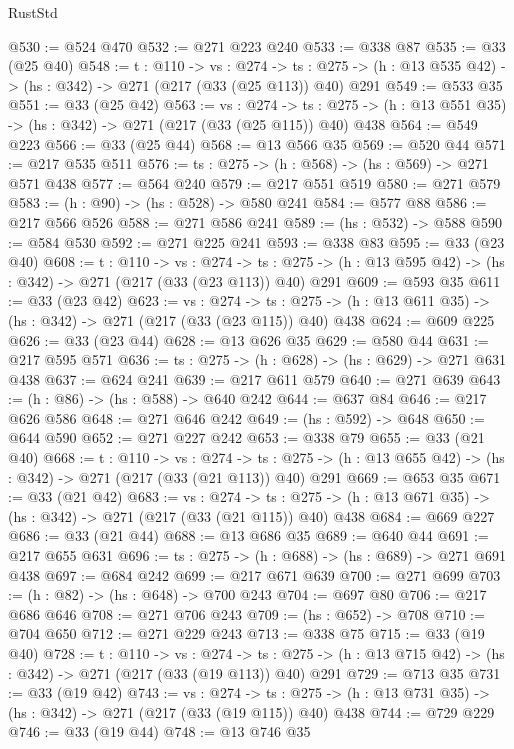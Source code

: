 \begin{lexlean}{RustStd}
\begin{coremodule}
@530 := @524 @470
@532 := @271 @223 @240
@533 := @338 @87
@535 := @33 (@25 @40)
@548 := {t : @110} ->
  {vs : @274} ->
  {ts : @275} -> (h : @13 @535 @42) -> (hs : @342) -> @271 (@217 (@33 (@25 @113)) @40) @291
@549 := @533 @35
@551 := @33 (@25 @42)
@563 := {vs : @274} ->
  {ts : @275} -> (h : @13 @551 @35) -> (hs : @342) -> @271 (@217 (@33 (@25 @115)) @40) @438
@564 := @549 @223
@566 := @33 (@25 @44)
@568 := @13 @566 @35
@569 := @520 @44
@571 := @217 @535 @511
@576 := {ts : @275} -> (h : @568) -> (hs : @569) -> @271 @571 @438
@577 := @564 @240
@579 := @217 @551 @519
@580 := @271 @579
@583 := (h : @90) -> (hs : @528) -> @580 @241
@584 := @577 @88
@586 := @217 @566 @526
@588 := @271 @586 @241
@589 := (hs : @532) -> @588
@590 := @584 @530
@592 := @271 @225 @241
@593 := @338 @83
@595 := @33 (@23 @40)
@608 := {t : @110} ->
  {vs : @274} ->
  {ts : @275} -> (h : @13 @595 @42) -> (hs : @342) -> @271 (@217 (@33 (@23 @113)) @40) @291
@609 := @593 @35
@611 := @33 (@23 @42)
@623 := {vs : @274} ->
  {ts : @275} -> (h : @13 @611 @35) -> (hs : @342) -> @271 (@217 (@33 (@23 @115)) @40) @438
@624 := @609 @225
@626 := @33 (@23 @44)
@628 := @13 @626 @35
@629 := @580 @44
@631 := @217 @595 @571
@636 := {ts : @275} -> (h : @628) -> (hs : @629) -> @271 @631 @438
@637 := @624 @241
@639 := @217 @611 @579
@640 := @271 @639
@643 := (h : @86) -> (hs : @588) -> @640 @242
@644 := @637 @84
@646 := @217 @626 @586
@648 := @271 @646 @242
@649 := (hs : @592) -> @648
@650 := @644 @590
@652 := @271 @227 @242
@653 := @338 @79
@655 := @33 (@21 @40)
@668 := {t : @110} ->
  {vs : @274} ->
  {ts : @275} -> (h : @13 @655 @42) -> (hs : @342) -> @271 (@217 (@33 (@21 @113)) @40) @291
@669 := @653 @35
@671 := @33 (@21 @42)
@683 := {vs : @274} ->
  {ts : @275} -> (h : @13 @671 @35) -> (hs : @342) -> @271 (@217 (@33 (@21 @115)) @40) @438
@684 := @669 @227
@686 := @33 (@21 @44)
@688 := @13 @686 @35
@689 := @640 @44
@691 := @217 @655 @631
@696 := {ts : @275} -> (h : @688) -> (hs : @689) -> @271 @691 @438
@697 := @684 @242
@699 := @217 @671 @639
@700 := @271 @699
@703 := (h : @82) -> (hs : @648) -> @700 @243
@704 := @697 @80
@706 := @217 @686 @646
@708 := @271 @706 @243
@709 := (hs : @652) -> @708
@710 := @704 @650
@712 := @271 @229 @243
@713 := @338 @75
@715 := @33 (@19 @40)
@728 := {t : @110} ->
  {vs : @274} ->
  {ts : @275} -> (h : @13 @715 @42) -> (hs : @342) -> @271 (@217 (@33 (@19 @113)) @40) @291
@729 := @713 @35
@731 := @33 (@19 @42)
@743 := {vs : @274} ->
  {ts : @275} -> (h : @13 @731 @35) -> (hs : @342) -> @271 (@217 (@33 (@19 @115)) @40) @438
@744 := @729 @229
@746 := @33 (@19 @44)
@748 := @13 @746 @35

\end{coremodule}
\end{lexlean}
